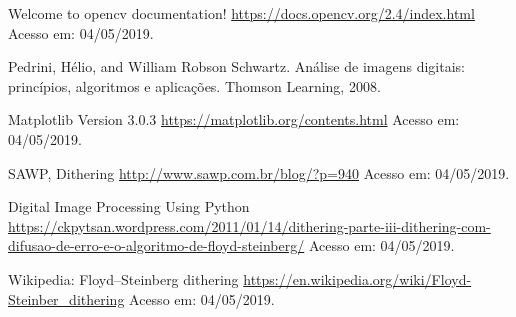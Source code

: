 \documentclass[twoside,twocolumn]{article}
\begin{document}
\begin{thebibliography}{99} %

 Welcome to opencv documentation! \href{https://docs.opencv.org/2.4/index.html}{https://docs.opencv.org/2.4/index.html} Acesso em: 04/05/2019.

 Pedrini, Hélio, and William Robson Schwartz. Análise de imagens digitais: princípios, algoritmos e aplicações. Thomson Learning, 2008.

 Matplotlib Version 3.0.3 \href{https://matplotlib.org/contents.html}{https://matplotlib.org/contents.html} Acesso em: 04/05/2019.

 SAWP, Dithering \href{http://www.sawp.com.br/blog/?p=940}{http://www.sawp.com.br/blog/?p=940} Acesso em: 04/05/2019.

 Digital Image Processing Using Python \href{https://ckpytsan.wordpress.com/2011/01/14/dithering-parte-iii-dithering-com-difusao-de-erro-e-o-algoritmo-de-floyd-steinberg/}{https://ckpytsan.wordpress.com/2011/01/14/dithering-parte-iii-dithering-com-difusao-de-erro-e-o-algoritmo-de-floyd-steinberg/} Acesso em: 04/05/2019.

 Wikipedia: Floyd–Steinberg dithering \href{https://en.wikipedia.org/wiki/Floyd-Steinber_dithering}{https://en.wikipedia.org/wiki/Floyd-Steinber_dithering} Acesso em: 04/05/2019.
 
\end{thebibliography}

\end{document}
